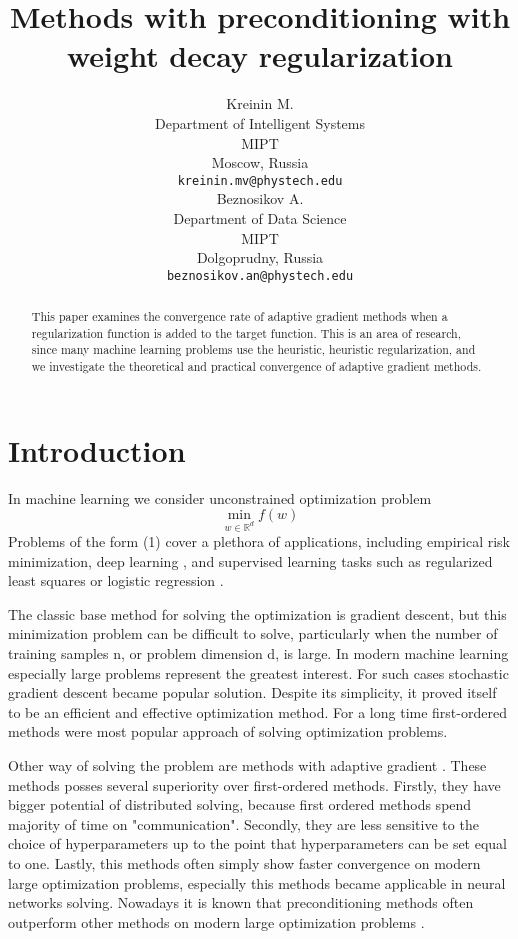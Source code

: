 \documentclass{article}
\title{Methods with preconditioning with weight decay regularization}
\author{ Kreinin M. \\
	Department of Intelligent Systems\\
	MIPT\\
	Moscow, Russia \\
	\texttt{kreinin.mv@phystech.edu} \\
	\And
	Beznosikov A. \\
	Department of Data Science\\
	MIPT\\
	Dolgoprudny, Russia \\
	\texttt{beznosikov.an@phystech.edu} \\
}
\date{}
\begin{document}
\maketitle

\begin{abstract}
	This paper examines the convergence rate of adaptive gradient methods when a regularization function is added to the target function. This is an area of research, since many machine learning problems use the heuristic, heuristic regularization, and we investigate the theoretical and practical convergence of adaptive gradient methods.
\end{abstract}


\section{Introduction}
In machine learning we consider unconstrained optimization problem
\begin{equation}
	\min_{w \in \mathbb{R}^d} f(w)
\end{equation}
Problems of the form (1) cover a plethora of applications, including empirical risk minimization,
deep learning \citep{lecun2015deep}, and supervised learning \citep{cunningham2008supervised} tasks such as regularized least squares \citep{rifkin2007notes} or logistic regression \citep{shalev2014understanding}.

The classic base method for solving the optimization is gradient descent, but this minimization problem can be difficult to solve, particularly when the number of training samples n, or problem dimension d, is large.
In modern machine learning especially large problems represent the greatest interest.
For such cases stochastic gradient descent \citep{bottou2010large} became popular solution.
Despite its simplicity, it proved itself to be an efficient and effective optimization method.
For a long time first-ordered methods were most popular approach of solving optimization problems.

Other way of solving the problem are methods with adaptive gradient \citep{wilson2017marginal}. These methods posses several superiority over first-ordered methods.
Firstly, they have bigger potential of distributed solving, because first ordered methods spend majority of time on "communication".
Secondly, they are less sensitive to the choice of hyperparameters up to the point that hyperparameters can be set equal to one.
Lastly, this methods often simply show faster convergence on modern large optimization problems, especially this methods became applicable in neural networks solving.
Nowadays it is known that preconditioning methods often outperform other methods on modern large optimization problems \citep{zhang2018three, yao2021adahessian, kingma2014adam, goldberg2011oasis}.
\end{document}
